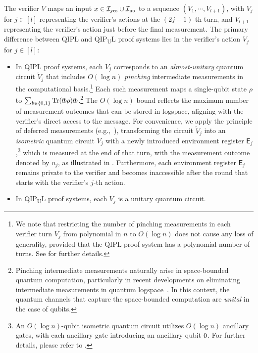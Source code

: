 \documentclass[11pt, a4paper]{article}
\numberwithin{equation}{section}
\numberwithin{figure}{section}
\newcommand{\QIPL}{\textnormal{\textsf{QIPL}}\xspace}
\newcommand{\QIPUL}{\texorpdfstring{\textnormal{\textsf{QIP}\textsubscript{\textnormal{U}}\textsf{L}}}\xspace}
\let\ket\relax\DeclarePairedDelimiter\ket{\lvert}{\rangle}
\let\bra\relax\DeclarePairedDelimiter\bra{\langle}{\rvert}
\newcommand{\ketbra}[2]{\ensuremath{\ket{#1}\!\bra{#2}}}
\newcommand{\Tr}{\mathrm{Tr}}
\newcommand{\yes}{{\rm yes}}
\newcommand{\no}{{\rm no}}
\newcommand{\binset}{\{0,1\}}
\newcommand{\calI}{\mathcal{I}}
\newcommand{\sfE}{\mathsf{E}}
\begin{document}
The verifier $V$ maps an input $x\in \calI_{\yes} \cup \calI_{\no}$ to a sequence $(V_1,\cdots,V_{l+1})$, with $V_j$ for $j \in [l]$ representing the verifier's actions at the $(2j-1)$-th turn, and $V_{l+1}$ representing the verifier's action just before the final measurement. The primary difference between \QIPL{} and \QIPUL{} proof systems lies in the verifier's action $V_j$ for $j\in[l]$: 
\begin{itemize}[itemsep=0.33em, topsep=0.33em, parsep=0.33em]
    \item In \QIPL{} proof systems, each $V_j$ corresponds to an \textit{almost-unitary} quantum circuit $\widetilde{V}_j$ that includes $O(\log n)$ \textit{pinching} intermediate measurements in the computational basis.\footnote{We note that restricting the number of pinching measurements in each verifier turn $V_j$ from polynomial in $n$ to $O(\log{n})$ does not cause any loss of generality, provided that the \QIPL{} proof system has a polynomial number of turns. See  for further details.}
    Each such measurement maps a single-qubit state $\rho$ to $\sum_{b\in\binset} \Tr(\ketbra{b}{b} \rho)\ketbra{b}{b}$.\footnote{Pinching intermediate measurements naturally arise in space-bounded quantum computation, particularly in recent developments on eliminating intermediate measurements in quantum logspace~\cite{GRZ21,GR22}. In this context, the quantum channels that capture the space-bounded computation are \textit{unital} in the case of qubits. }
    The $O(\log{n})$ bound reflects the maximum number of measurement outcomes that can be stored in logspace, aligning with the verifier's direct access to the message. 
    For convenience, we apply the principle of deferred measurements (e.g.,~\cite[Section 4.4]{NC10}), transforming the circuit $\widetilde{V}_j$ into an \textit{isometric} quantum circuit $V_j$ with a newly introduced environment register $\sfE_j$,\footnote{An $O(\log{n})$-qubit isometric quantum circuit utilizes $O(\log n)$ ancillary gates, with each ancillary gate introducing an ancillary qubit $\ket{0}$. For further details, please refer to . } which is measured at the end of that turn, with the measurement outcome denoted by $u_j$, as illustrated in .
    Furthermore, each environment register $\sfE_j$ remains private to the verifier and becomes inaccessible after the round that starts with the verifier's $j$-th action. 
    \item In \QIPUL{} proof systems, each $V_j$ is a unitary quantum circuit. 
\end{itemize}
\end{document}
